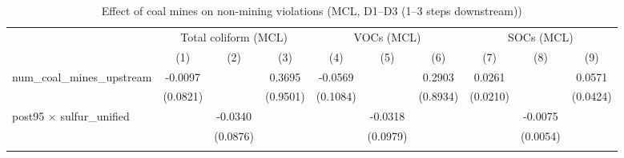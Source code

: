 
\begin{table}[htbp]
   
   \caption{\label{2sls_4step_d1_d3_nonminevio_mcl} Effect of coal mines on non-mining violations (MCL, D1--D3 (1--3 steps downstream))}
   \bigskip
   
   \centering
   
   \begin{adjustbox}{width = \textwidth, center}
      
      
      \begin{tabular}{lccccccccc}
         \toprule
         
          & \multicolumn{3}{c}{Total coliform (MCL)} & \multicolumn{3}{c}{VOCs (MCL)} & \multicolumn{3}{c}{SOCs (MCL)}\\
         
                                                           & (1)           & (2)           & (3)           & (4)                  & (5)                   & (6)                   & (7)           & (8)                   & (9)\\  
         
         \midrule 
         num\_coal\_mines\_upstream                        & -0.0097       &               & 0.3695        & -0.0569              &                       & 0.2903                & 0.0261        &                       & 0.0571\\   
                                                           & (0.0821)      &               & (0.9501)      & (0.1084)             &                       & (0.8934)              & (0.0210)      &                       & (0.0424)\\   
         post95 $\times$ sulfur\_unified                   &               & -0.0340       &               &                      & -0.0318               &                       &               & -0.0075               &   \\   
                                                           &               & (0.0876)      &               &                      & (0.0979)              &                       &               & (0.0054)              &   \\   
         
          \\
         

\end{tabular}
\end{adjustbox}
\end{table}
